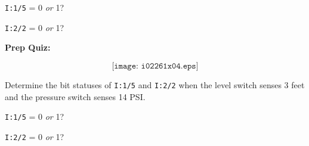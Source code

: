 {\tt I:1/5} = 0 {\it or} 1?

\vskip 10pt

{\tt I:2/2} = 0 {\it or} 1?




\vfil \eject

\noindent
{\bf Prep Quiz:}

$$\texttt{[image: i02261x04.eps]}$$

Determine the bit statuses of {\tt I:1/5} and {\tt I:2/2} when the level switch senses 3 feet and the pressure switch senses 14 PSI.

\vskip 10pt

{\tt I:1/5} = 0 {\it or} 1?

\vskip 10pt

{\tt I:2/2} = 0 {\it or} 1?





